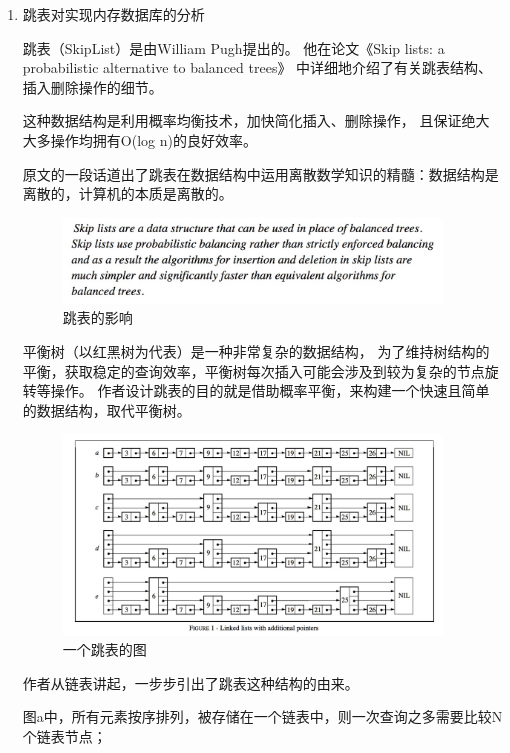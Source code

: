 	\begin{enumerate}
		\item 跳表对实现内存数据库的分析
		
		跳表（SkipList）是由William Pugh提出的。
		他在论文《Skip lists: a probabilistic alternative to balanced trees》
		中详细地介绍了有关跳表结构、插入删除操作的细节。

		这种数据结构是利用概率均衡技术，加快简化插入、删除操作，
		且保证绝大大多操作均拥有O(log n)的良好效率。
		
		原文的一段话道出了跳表在数据结构中运用离散数学知识的精髓：数据结构是离散的，计算机的本质是离散的。

		\begin{figure}[H]
			\centering
			\includegraphics[width=0.95\textwidth]{images/skiplist_effect}
			\caption{跳表的影响}
			\label{skiplist_effect}
		\end{figure}

		平衡树（以红黑树为代表）是一种非常复杂的数据结构，
		为了维持树结构的平衡，获取稳定的查询效率，平衡树每次插入可能会涉及到较为复杂的节点旋转等操作。
		作者设计跳表的目的就是借助概率平衡，来构建一个快速且简单的数据结构，取代平衡树。

		\begin{figure}[H]
			\centering
			\includegraphics[width=0.95\textwidth]{images/skiplist_intro}
			\caption{一个跳表的图}
			\label{skiplist_intro}
		\end{figure}

		作者从链表讲起，一步步引出了跳表这种结构的由来。

		图a中，所有元素按序排列，被存储在一个链表中，则一次查询之多需要比较N个链表节点；


\end{enumerate}
